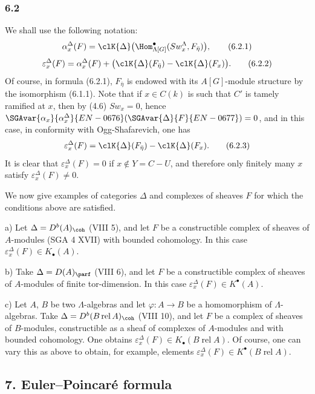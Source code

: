 \subsubsection*{6.2}

We shall use the following notation:
\[
\alpha_x^\Delta(F)
=
\clK{\Delta}\bigl(\Hom^\bullet_{\Lambda[G]}(Sw_x^\Lambda,F_{\bar\eta})\bigr),
\tag{6.2.1}
\]
\[
\varepsilon_x^\Delta(F)
=
\alpha_x^\Delta(F)+
\bigl(\clK{\Delta}(F_{\bar\eta})-\clK{\Delta}(F_x)\bigr).
\tag{6.2.2}
\]
Of course, in formula (6.2.1), $F_{\bar\eta}$ is endowed with its $A[G]$-module structure by the isomorphism (6.1.1). Note that if $x\in C(k)$ is such that $C'$ is tamely ramified at $x$, then by (4.6) $Sw_x=0$, hence $\SGAvar{\alpha_x}{\alpha_x^\Delta}{EN-0676}(\SGAvar{\Delta}{F}{EN-0677})=0$, and in this case, in conformity with Ogg-Shafarevich, one has
\[
\varepsilon_x^\Delta(F)=\clK{\Delta}(F_{\bar\eta})-\clK{\Delta}(F_x).
\tag{6.2.3}
\]
It is clear that $\varepsilon_x^\Delta(F)=0$ if $x\notin Y=C-U$, and therefore only finitely many $x$ satisfy $\varepsilon_x^\Delta(F)\ne0$.

We now give examples of categories $\Delta$ and complexes of sheaves $F$ for which the conditions above are satisfied.

a) Let $\Delta=D^b(A)_{\coh}$ (VIII 5), and let $F$ be a constructible complex of sheaves of $A$-modules (SGA 4 XVII) with bounded cohomology. In this case $\varepsilon_x^\Delta(F)\in K_\bullet(A)$.

b) Take $\Delta=D(A)_{\parf}$ (VIII 6), and let $F$ be a constructible complex of sheaves of $A$-modules of finite tor-dimension. In this case $\varepsilon_x^\Delta(F)\in K^{\bullet}(A)$.

c) Let $A$, $B$ be two $\Lambda$-algebras and let $\varphi:A\to B$ be a homomorphism of $\Lambda$-algebras. Take $\Delta=D^b(B\operatorname{ rel }A)_{\coh}$ (VIII 10), and let $F$ be a complex of sheaves of $B$-modules, constructible as a sheaf of complexes of $A$-modules and with bounded cohomology. One obtains $\varepsilon_x^\Delta(F)\in K_\bullet(B\operatorname{ rel }A)$. Of course, one can vary this as above to obtain, for example, elements $\varepsilon_x^\Delta(F)\in K^{\bullet}(B\operatorname{ rel }A)$.

\subsection*{7. Euler--Poincaré formula}

